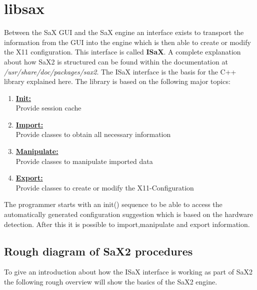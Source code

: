 \chapter{libsax}
\minitoc

Between the SaX GUI and the SaX engine an interface exists to
transport the information from the GUI into the engine which
is then able to create or modify the X11 configuration. This
interface is called \textbf{ISaX}. A complete explanation about
how SaX2 is structured can be found within the documentation
at \textit{/usr/share/doc/packages/sax2}. 
The ISaX interface is the basis for the C++ library explained here.
The library is based on the following major topics:

\begin{enumerate}
\item \textbf{\underline{Init:}}\\
      Provide session cache
\item \textbf{\underline{Import:}}\\
      Provide classes to obtain all necessary information
\item \textbf{\underline{Manipulate:}}\\
      Provide classes to manipulate imported data
\item \textbf{\underline{Export:}}\\
      Provide classes to create or modify the X11-Configuration
\end{enumerate}

The programmer starts with an init() sequence to be able to
access the automatically generated configuration suggestion which is
based on the hardware detection. After this it is possible to
import,manipulate and export information.

\section{Rough diagram of SaX2 procedures}
To give an introduction about how the ISaX interface is working
as part of SaX2 the following rough overview will show the basics
of the SaX2 engine.

\newpage

